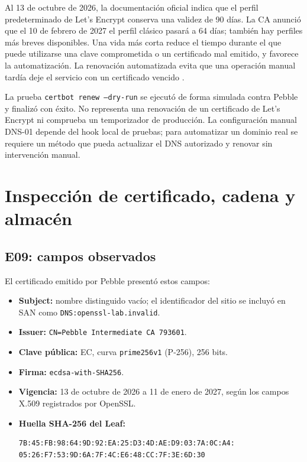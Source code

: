 \documentclass[11pt,a4paper]{article}
\begin{document}
Al 13 de octubre de 2026, la documentación oficial indica que el perfil
predeterminado de Let's Encrypt conserva una validez de 90 días. La CA anunció
que el 10 de febrero de 2027 el perfil clásico pasará a 64 días; también hay
perfiles más breves disponibles. Una vida más corta reduce el tiempo durante
el que puede utilizarse una clave comprometida o un certificado mal emitido,
y favorece la automatización. La renovación automatizada evita que una
operación manual tardía deje el servicio con un certificado vencido
\cite{le-lifetime,le-64day}.

La prueba \texttt{certbot renew --dry-run} se ejecutó de forma simulada contra
Pebble y finalizó con éxito. No representa una renovación de un certificado de
Let's Encrypt ni comprueba un temporizador de producción. La configuración
manual DNS-01 depende del hook local de pruebas; para automatizar un dominio
real se requiere un método que pueda actualizar el DNS autorizado y renovar
sin intervención manual.

\section{Inspección de certificado, cadena y almacén}
\subsection{E09: campos observados}
El certificado emitido por Pebble presentó estos campos:
\begin{itemize}[noitemsep]
\item \textbf{Subject:} nombre distinguido vacío; el identificador del sitio
se incluyó en SAN como \texttt{DNS:openssl-lab.invalid}.
\item \textbf{Issuer:} \texttt{CN=Pebble Intermediate CA 793601}.
\item \textbf{Clave pública:} EC, curva \texttt{prime256v1} (P-256), 256 bits.
\item \textbf{Firma:} \texttt{ecdsa-with-SHA256}.
\item \textbf{Vigencia:} 13 de octubre de 2026 a 11 de enero de 2027, según
los campos X.509 registrados por OpenSSL.
\item \textbf{Huella SHA-256 del Leaf:}
\begin{verbatim}
7B:45:FB:98:64:9D:92:EA:25:D3:4D:AE:D9:03:7A:0C:A4:
05:26:F7:53:9D:6A:7F:4C:E6:48:CC:7F:3E:6D:30
\end{verbatim}
\end{itemize}
\end{document}
